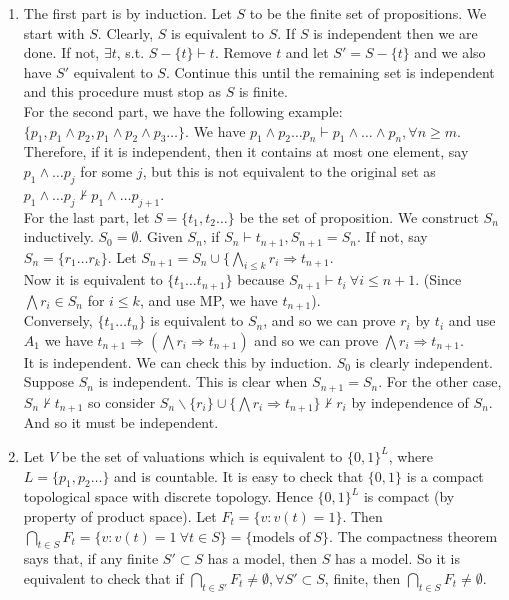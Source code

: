 \begin{enumerate}
\item The first part is by induction. Let $S$ to be the finite set of propositions. We start with $S$. Clearly, $S$ is equivalent to $S$. If $S$ is independent then we are done. If not, $\exists t$, s.t. $S - \{t\} \vdash t$. Remove $t$ and let $S'=S - \{t\}$ and we also have $S'$ equivalent to $S$. Continue this until the remaining set is independent and this procedure must stop as $S$ is finite.\\
    For the second part, we have the following example:\\
    $\{p_1, p_1 \wedge p_2, p_1 \wedge p_2 \wedge p_3 \ldots \}$. We have $p_1 \wedge p_2 \ldots p_n \vdash p_1 \wedge \ldots \wedge p_n, \forall n \ge m$.
    Therefore, if it is independent, then it contains at most one element, say $p_1 \wedge \ldots p_j$ for some $j$, but this is not equivalent to the original set as $p_1 \wedge \ldots p_j \not \vdash p_1 \wedge \ldots p_{j+1}$.\\
    For the last part, let $S=\{t_1,t_2 \ldots\}$ be the set of proposition. We construct $S_n$ inductively. $S_0 = \emptyset$. Given $S_n$, if $S_n \vdash t_{n+1}, S_{n+1}=S_n$. If not, say $S_n=\{r_1 \ldots r_k\}$. Let $S_{n+1} =S_n \cup \{\bigwedge_{i \le k}r_i \Rightarrow t_{n+1}$.\\
    Now it is equivalent to $\{t_1 \ldots t_{n+1}\}$ because $S_{n+1} \vdash t_i ~\forall i \le n+1$. (Since $\bigwedge r_i \in S_n$ for $i \le k$, and use MP, we have $t_{n+1}$). \\
    Conversely, $\{t_1 \ldots t_n\}$ is equivalent to $S_n$, and so we can prove $r_i$ by $t_i$ and use $A_1$ we have $t_{n+1} \Rightarrow (\bigwedge r_i \Rightarrow t_{n+1})$ and so we can prove $\bigwedge r_i \Rightarrow t_{n+1}$.\\
    It is independent. We can check this by induction. $S_0$ is clearly independent. Suppose $S_n$ is independent. This is clear when $S_{n+1}=S_n$. For the other case, $S_n \not \vdash t_{n+1}$ so consider $S_n \backslash \{r_i\} \cup \{\bigwedge r_i \Rightarrow t_{n+1}\} \not \vdash r_i$ by independence of $S_n$. And so it must be independent.\\
\item Let $V$ be the set of valuations which is equivalent to $\{0,1\}^L$, where $L= \{p_1,p_2 \ldots\}$ and is countable. It is easy to check that $\{0,1\}$ is a compact topological space with discrete topology. Hence $\{0,1\}^L$ is compact (by property of product space). Let $F_t=\{v: v(t)=1\}$. Then $\bigcap_{t \in S}F_t=\{v: v(t)=1 ~\forall t \in S\}=\{\text{models of}~  S\}$. The compactness theorem says that, if any finite $S' \subset S$ has a model, then $S$ has a model. So it is equivalent to check that if $\bigcap_{t \in S'}F_t \neq \emptyset, \forall S' \subset S$, finite, then $\bigcap_{t \in S}F_t \neq \emptyset$.\\

\end{enumerate}
